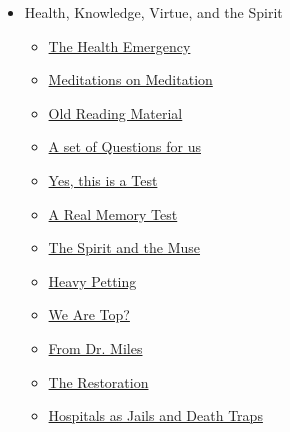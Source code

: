 \documentclass{article}
\newcommand{\insertmydocument}[2]{ %
  \item \href{http://www.mileswmathis.com/#2}{#1}
}
\begin{document}
\begin{itemize}
\begin{itemize}
\begin{itemize}
      \insertmydocument{Leonardo DiCaprio Italian?}{leo.pdf}
      \insertmydocument{Strange Relations}{strange.pdf}
      \insertmydocument{Strange Relations 2: The Illusion of Perfection}{strange2.pdf}
      \insertmydocument{Strange Relations 3}{strange3.pdf}
      \insertmydocument{Strange Relations 4}{SR4.pdf}
      \insertmydocument{Movie Stars}{beepitt.pdf}
      \insertmydocument{Brad Pitt's Genealogy}{pitt.pdf}
      \insertmydocument{Brad Pitt Artiste Manqué}{pitt2.pdf}
      \insertmydocument{Who is Brad Pitt, Really?}{pitt3.pdf}
      \insertmydocument{Steve Martin: A Wild and Crazy. . . Genealogy}{martin.pdf}
      \insertmydocument{Bill Cosby}{cosby.pdf}
      \insertmydocument{The Bill Cosby Story is All Fiction}{cosby2.pdf}
      \insertmydocument{What They Don't Tell You About Keanu Reeves}{keanu.pdf}
      \insertmydocument{Why I Think Mel Gibson is Jewish}{mel.pdf}
      \insertmydocument{Chris Pratt is... well, a Pratt}{pratt.pdf}
      \insertmydocument{Oprah's Genealogy}{oprah.pdf}
      \insertmydocument{Jimmy Stewart}{stew.pdf}
      \insertmydocument{Stephen Colbert}{colbert.pdf}
      \insertmydocument{Ingmar and Ingrid Bergman were Jewish and they were related}{berg.pdf}
      \insertmydocument{James Franco super squirrel}{jfranco.pdf}
      \insertmydocument{Spooky Times in Maysville, KY}{cloon.pdf}
      \insertmydocument{David Lynch}{lynch.pdf}
      \insertmydocument{Michael Douglas}{doug.pdf}
      \insertmydocument{Poor Jim Carrey poor all of us}{carrey.pdf}
      \insertmydocument{Who is Arnold... Really?}{arnold.pdf}
      \insertmydocument{Russell Brand's Genealogy}{brand2.pdf}
      \insertmydocument{The Farrells}{farrell.pdf}
      \insertmydocument{Bits and Bobs}{cowell.pdf}
      \insertmydocument{More Bits and Bobs}{jkt.pdf}
      \insertmydocument{More Celebrity Genealogy Outings}{gere.pdf}
      \insertmydocument{Did You Know?}{jlaw.pdf}
      \insertmydocument{Are You Sick of Andrew Tate Yet?}{atate.pdf}
      \insertmydocument{State of the Union Address}{muse2.pdf}
      \insertmydocument{Star Salaries are Fake}{starsal.pdf}
      \insertmydocument{I Call Out Nell Scovell}{letter.pdf}
      \insertmydocument{Buddies Will Smith and Chris Rock}{rocksmith.pdf}
    \end{itemize}

    \item Health, Knowledge, Virtue, and the Spirit
    \begin{itemize}

      \insertmydocument{The Health Emergency}{org.pdf}
      \insertmydocument{Meditations on Meditation}{medit.pdf}
      \insertmydocument{Old Reading Material}{boo.pdf}
      \insertmydocument{A set of Questions for us}{test.pdf}
      \insertmydocument{Yes, this is a Test}{test2.pdf}
      \insertmydocument{A Real Memory Test}{mem.pdf}
      \insertmydocument{The Spirit and the Muse}{spirit.pdf}
      \insertmydocument{Heavy Petting}{muse3.pdf}
      \insertmydocument{We Are Top?}{michael.pdf}
      \insertmydocument{From Dr. Miles}{iodine.pdf}
      \insertmydocument{The Restoration}{focus.pdf}
      \insertmydocument{Hospitals as Jails and Death Traps}{horspital.pdf}


\end{itemize}
\end{itemize}
\end{itemize}
\end{document}
